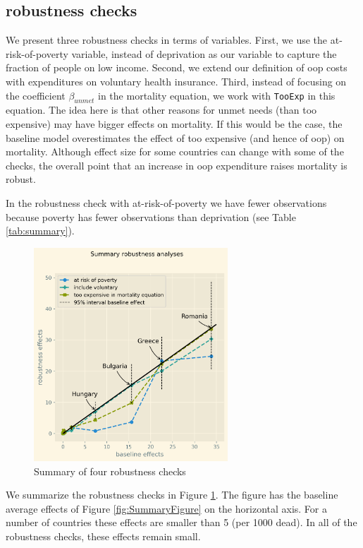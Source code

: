 \documentclass[a4paper,12pt]{article}
\begin{document}
\subsection{robustness checks}
\label{sec:org8956628}

We present three robustness checks in terms of variables. First, we use the at-risk-of-poverty variable, instead of deprivation as our variable to capture the fraction of people on low income. Second, we extend our definition of oop costs with expenditures on voluntary health insurance. Third, instead of focusing on the coefficient \(\beta_{unmet}\) in the mortality equation, we work with \texttt{TooExp} in this equation. The idea here is that other reasons for unmet needs (than too expensive) may have bigger effects on mortality. If this would be the case, the baseline model overestimates the effect of too expensive (and hence of oop) on mortality. Although effect size for some countries can change with some of the checks, the overall point that an increase in oop expenditure raises mortality is robust.

In the robustness check with at-risk-of-poverty we have fewer observations because poverty has fewer observations than deprivation (see Table \ref{tab:summary}). 

\begin{figure}[htbp]
\centering
\includegraphics[height=8cm]{./figures/robustness_summary.png}
\caption{\label{fig:robustness_summary}Summary of four robustness checks}
\end{figure}

We summarize the robustness checks in Figure \ref{fig:robustness_summary}. The figure has the baseline average effects of Figure \ref{fig:SummaryFigure} on the horizontal axis. For a number of countries these effects are smaller than 5 (per 1000 dead). In all of the robustness checks, these effects remain small.
\end{document}
